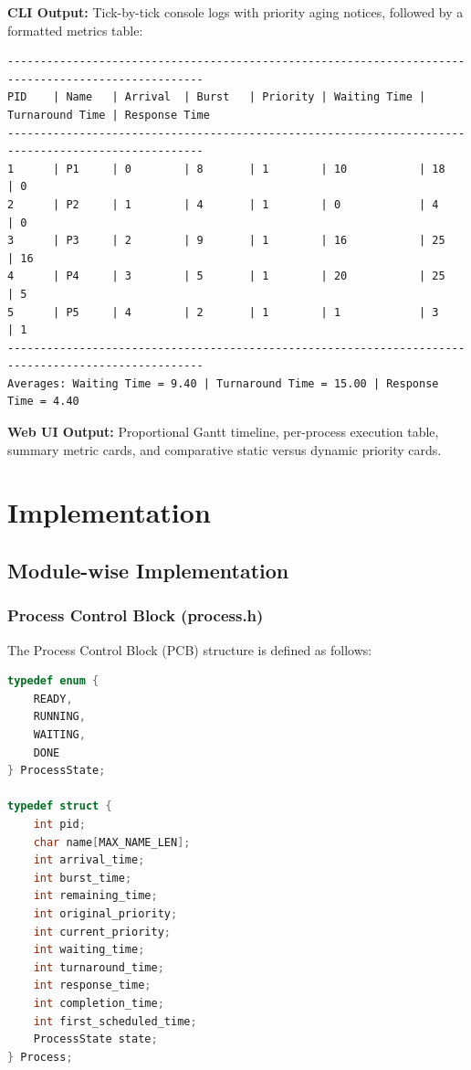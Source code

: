 \documentclass[12pt,a4paper]{report}
\begin{document}
\textbf{CLI Output:} Tick-by-tick console logs with priority aging notices, followed by a formatted metrics table:
\begin{lstlisting}
----------------------------------------------------------------------------------------------------
PID    | Name   | Arrival  | Burst   | Priority | Waiting Time | Turnaround Time | Response Time
----------------------------------------------------------------------------------------------------
1      | P1     | 0        | 8       | 1        | 10           | 18              | 0            
2      | P2     | 1        | 4       | 1        | 0            | 4               | 0            
3      | P3     | 2        | 9       | 1        | 16           | 25              | 16           
4      | P4     | 3        | 5       | 1        | 20           | 25              | 5            
5      | P5     | 4        | 2       | 1        | 1            | 3               | 1            
----------------------------------------------------------------------------------------------------
Averages: Waiting Time = 9.40 | Turnaround Time = 15.00 | Response Time = 4.40
\end{lstlisting}

\textbf{Web UI Output:} Proportional Gantt timeline, per-process execution table, summary metric cards, and comparative static versus dynamic priority cards.

\chapter{Implementation}\label{ch6}

\section{Module-wise Implementation}

\subsection{Process Control Block (process.h)}
The Process Control Block (PCB) structure is defined as follows:
\begin{lstlisting}[language=C, caption={Process Structure Definition (process.h)}]
typedef enum {
    READY,
    RUNNING,
    WAITING,
    DONE
} ProcessState;

typedef struct {
    int pid;
    char name[MAX_NAME_LEN];
    int arrival_time;
    int burst_time;
    int remaining_time;
    int original_priority;
    int current_priority;
    int waiting_time;
    int turnaround_time;
    int response_time;
    int completion_time;
    int first_scheduled_time;
    ProcessState state;
} Process;
\end{lstlisting}
\end{document}
